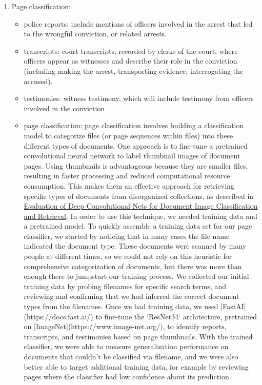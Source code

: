\documentclass{article}
\begin{document}
\begin{enumerate}
    \item Page classification:
    \begin{itemize}
        \item police reports: include mentions of officers involved in the arrest that led to the wrongful conviction, or related arrests.
        \item transcripts: court transcripts, recorded by clerks of the court, where officers appear as witnesses and describe their role in the conviction (including making the arrest, transporting evidence, interrogating the accused).
        \item testimonies: witness testimony, which will include testimony from officers involved in the conviction        
        \item page classification: page classification involves building a classification model to categorize files (or page sequences within files) into these different types of documents. One approach is to fine-tune a pretrained convolutional neural network to label thumbnail images of document pages. Using thumbnails is advantageous because they are smaller files, resulting in faster processing and reduced computational resource consumption. This makes them an effective approach for retrieving specific types of documents from disorganized collections, as described in \href{https://arxiv.org/abs/1502.07058}{Evaluation of Deep Convolutional Nets for Document Image Classification and Retrieval}. In order to use this technique, we needed training data and a pretrained model. To quickly assemble a training data set for our page classifier, we started by noticing that in many cases the file name indicated the document type. These documents were scanned by many people at different times, so we could not rely on this heuristic for comprehensive categorization of documents, but there was more than enough there to jumpstart our training process. We collected our initial training data by probing filenames for specific search terms, and reviewing and confirming that we had inferred the correct document types from the filenames. Once we had training data, we used [FastAI](https://docs.fast.ai/) to fine-tune the `ResNet34` architecture, pretrained on [ImageNet](https://www.image-net.org/), to identify reports, transcripts, and testimonies based on page thumbnails. With the trained classifier, we were able to measure generalization performance on documents that couldn't be classified via filename, and we were also better able to target additional training data, for example by reviewing pages where the classifier had low confidence about its prediction. 
    \end{itemize}
    

\end{enumerate}
\end{document}
